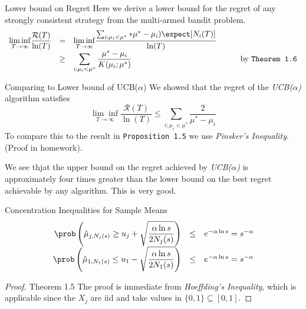 \documentclass[11pt,a4paper]{article}
\begin{document}
\begin{proposition}{Lower bound on Regret}
  Here we derive a lower bound for the regret of any strongly consistent strategy from the multi-armed bandit problem.
  \[\begin{array}{rclcl}
  \underset{T\to\infty}{\lim\inf}\dfrac{\mathcal{R}(T)}{\ln(T)}&=&\underset{T\to\infty}{\lim\inf}\dfrac{\sum_{i;\mu_i<\mu^*}*\mu^*-\mu_i)\expect[N_i(T)]}{\ln(T)}&\quad&\\
  &\geq&\displaystyle\sum_{i;\mu_i<\mu^*}\frac{\mu^*-\mu_i}{K(\mu_i;\mu^*)}&&\text{by \texttt{Theorem 1.6}}
  \end{array}\]
\end{proposition}

\begin{proposition}{Comparing to Lower bound of UCB($\alpha$)}
  We showed that the regret of the \textit{UCB($\alpha$)} algorithm satisfies
  \[ \underset{T\to\infty}{\lim\inf}\frac{\mathcal{R}(T)}{\ln(T)}\leq\sum_{i;\mu_i<\mu^*}\frac2{\mu^*-\mu_i} \]
  To compare this to the result in \texttt{Proposition 1.5} we use \textit{Pinsker's Inequality}. (Proof in homework).
  \par We see thjat the upper bound on the regret achieved by \textit{UCB($\alpha$)} is approximately four times greater than the lower bound on the best regret achievable by any algorithm. This is very good.
\end{proposition}

\begin{theorem}{Concentration Inequalities for Sample Means}
  \[\begin{array}{rcl}
  \displaystyle\prob\left(\hat\mu_{j,N_j(s)}\geq u_j+\sqrt\frac{\alpha\ln s}{2N_j(s)}\right)&\leq&e^{-\alpha\ln s}=s^{-\alpha}\\
  \displaystyle\prob\left(\hat\mu_{1,N_1(s)}\leq u_1-\sqrt\frac{\alpha\ln s}{2N_1(s)}\right)&\leq&e^{-\alpha\ln s}=s^{-\alpha}
  \end{array}\]
\end{theorem}

\begin{proof}{Theorem 1.5}
  The proof is immediate from \textit{Hoeffding's Inequality}, which is applicable since the $X_j$ are iid and take values in $\{0,1\}\subseteq[0,1]$.
\end{proof}
\end{document}
